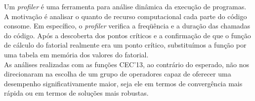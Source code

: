 Um {\it profiler} é uma ferramenta para análise dinâmica da execução de programas. A motivação é analisar o quanto de recurso computacional cada parte do código consome. Em específico, o {\it profiler} verifica a freqüência e a duração das chamadas do código. Após a descoberta dos pontos críticos e a confirmação de que o função de cálculo do fatorial realmente era um ponto crítico, substituímos a função por uma tabela em memória dos valores do fatorial.\\


As análises realizadas com as funções CEC'13, ao contrário do esperado, não nos direcionaram na escolha de um grupo de operadores capaz de oferecer uma desempenho significativamente maior, seja ele em termos de convergência mais rápida ou em termos de soluções mais robustas.\\